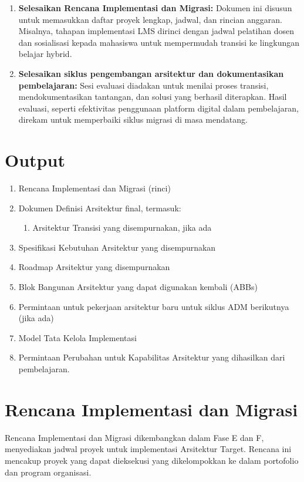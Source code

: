 \begin{enumerate}
	\item \textbf{Selesaikan Rencana Implementasi dan Migrasi:} 
	Dokumen ini disusun untuk memasukkan daftar proyek lengkap, jadwal, dan rincian anggaran. Misalnya, tahapan implementasi LMS dirinci dengan jadwal pelatihan dosen dan sosialisasi kepada mahasiswa untuk mempermudah transisi ke lingkungan belajar hybrid.
	
	\item \textbf{Selesaikan siklus pengembangan arsitektur dan dokumentasikan pembelajaran:} 
	Sesi evaluasi diadakan untuk menilai proses transisi, mendokumentasikan tantangan, dan solusi yang berhasil diterapkan. Hasil evaluasi, seperti efektivitas penggunaan platform digital dalam pembelajaran, direkam untuk memperbaiki siklus migrasi di masa mendatang.
\end{enumerate}

\section{Output}
\begin{enumerate}
	\item Rencana Implementasi dan Migrasi (rinci)
	\item Dokumen Definisi Arsitektur final, termasuk:
	\begin{enumerate}
		\item Arsitektur Transisi yang disempurnakan, jika ada
	\end{enumerate}
	\item Spesifikasi Kebutuhan Arsitektur yang disempurnakan
	\item Roadmap Arsitektur yang disempurnakan
	\item Blok Bangunan Arsitektur yang dapat digunakan kembali (ABBs)
	\item Permintaan untuk pekerjaan arsitektur baru untuk siklus ADM berikutnya (jika ada)
	\item Model Tata Kelola Implementasi
	\item Permintaan Perubahan untuk Kapabilitas Arsitektur yang dihasilkan dari pembelajaran.
\end{enumerate}

\section{Rencana Implementasi dan Migrasi}

Rencana Implementasi dan Migrasi dikembangkan dalam Fase E dan F, menyediakan jadwal proyek untuk implementasi Arsitektur Target. Rencana ini mencakup proyek yang dapat dieksekusi yang dikelompokkan ke dalam portofolio dan program organisasi. 

